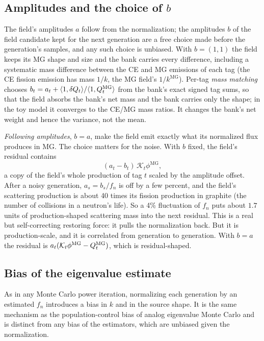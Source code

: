 \subsection{Amplitudes and the choice of $b$}

The field's amplitudes $a$ follow from the normalization; the amplitudes $b$ of the field candidate
kept for the next generation are a free choice made before the generation's samples, and any such
choice is unbiased. With $b=(1,1)$ the field keeps its MG shape and size and the bank carries every
difference, including a systematic mass difference between the CE and MG emissions of each tag (the CE
fission emission has mass $1/k$, the MG field's $1/k^{\mathrm{MG}}$). Per-tag \emph{mass matching}
chooses $b_t=a_t+\langle1,\delta Q_t\rangle/\langle1,Q^{\mathrm{MG}}_t\rangle$ from the bank's exact signed tag
sums, so that the field absorbs the bank's net mass and the bank carries only the shape; in the toy
model it converges to the CE/MG mass ratios. It changes the bank's net weight and hence the variance,
not the mean.

\emph{Following amplitudes}, $b=a$, make the field emit exactly what its normalized flux produces in
MG. The choice matters for the noise. With $b$ fixed, the field's residual contains
\begin{equation}
(a_t-b_t)\,\mathcal K_t\phi^{\mathrm{MG}},
\end{equation}
a copy of the field's whole production of tag $t$ scaled by the amplitude offset. After a noisy
generation, $a_s=b_s/f_n$ is off by a few percent, and the field's scattering production is about 40
times its fission production in graphite (the number of collisions in a neutron's life). So a 4\%
fluctuation of $f_n$ puts about $1.7$ units of production-shaped scattering mass into the next residual.
This is a real but self-correcting restoring force: it pulls the normalization back. But it is
production-scale, and it is correlated from generation to generation. With $b=a$ the residual is
$a_t(\mathcal K_t\phi^{\mathrm{MG}}-Q^{\mathrm{MG}}_t)$, which is residual-shaped.

\subsection{Bias of the eigenvalue estimate}

As in any Monte Carlo power iteration, normalizing each generation by an estimated $f_n$ introduces a
bias in $k$ and in the source shape. It is the same mechanism as the population-control bias of analog
eigenvalue Monte Carlo and is distinct from any bias of the estimators, which are unbiased given the
normalization.

